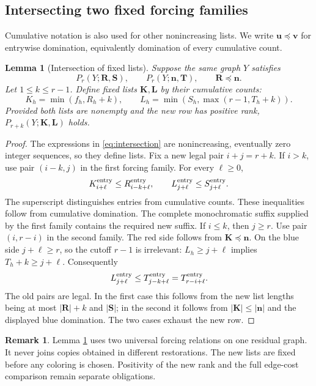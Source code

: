 \documentclass[11pt,a4paper]{article}
\newcommand{\nn}{\mathbf n}\newcommand{\mm}{\mathbf m}
\newtheorem{lemma}[theorem]{Lemma}
\theoremstyle{definition}
\newtheorem{remark}[theorem]{Remark}
\begin{document}
\subsection{Intersecting two fixed forcing families}
Cumulative notation is also used for other nonincreasing lists. We write $\mathbf u\preceq\mathbf v$ for entrywise domination, equivalently domination of every cumulative count.
\begin{lemma}[Intersection of fixed lists]\label{lem:intersection}
Suppose the same graph $Y$ satisfies
\[
P_r(Y;\mathbf R,\mathbf S),\qquad
P_r(Y;\nn,\mathbf T),\qquad \mathbf R\preceq\nn.
\]
Let $1\le k\le r-1$. Define fixed lists $\mathbf K,\mathbf L$ by their cumulative counts:
\begin{equation}\label{eq:intersection}
K_h=\min(f_h,R_h+k),\qquad
L_h=\min(S_h,\max(r-1,T_h+k)).
\end{equation}
Provided both lists are nonempty and the new row has positive rank,
$P_{r+k}(Y;\mathbf K,\mathbf L)$ holds.
\end{lemma}
\begin{proof}
The expressions in \eqref{eq:intersection} are nonincreasing, eventually zero integer sequences, so they define lists. Fix a new legal pair $i+j=r+k$.
If $i>k$, use pair $(i-k,j)$ in the first forcing family. For every $\ell\ge0$,
\[
K_{i+\ell}^{\rm entry}\le R_{i-k+\ell}^{\rm entry},
\qquad L_{j+\ell}^{\rm entry}\le S_{j+\ell}^{\rm entry}.
\]
The superscript distinguishes entries from cumulative counts. These inequalities follow from cumulative domination. The complete monochromatic suffix supplied by the first family contains the required new suffix.
If $i\le k$, then $j\ge r$. Use pair $(i,r-i)$ in the second family. The red side follows from $\mathbf K\preceq\nn$. On the blue side $j+\ell\ge r$, so the cutoff $r-1$ is irrelevant: $L_h\ge j+\ell$ implies $T_h+k\ge j+\ell$. Consequently
\[
L_{j+\ell}^{\rm entry}\le T_{j-k+\ell}^{\rm entry}
=T_{r-i+\ell}^{\rm entry}.
\]
The old pairs are legal. In the first case this follows from the new list lengths being at most $|\mathbf R|+k$ and $|\mathbf S|$; in the second it follows from $|\mathbf K|\le|\nn|$ and the displayed blue domination. The two cases exhaust the new row.
\end{proof}

\begin{remark}
Lemma \ref{lem:intersection} uses two universal forcing relations on one residual graph. It never joins copies obtained in different restorations. The new lists are fixed before any coloring is chosen. Positivity of the new rank and the full edge-cost comparison remain separate obligations.
\end{remark}
\end{document}
